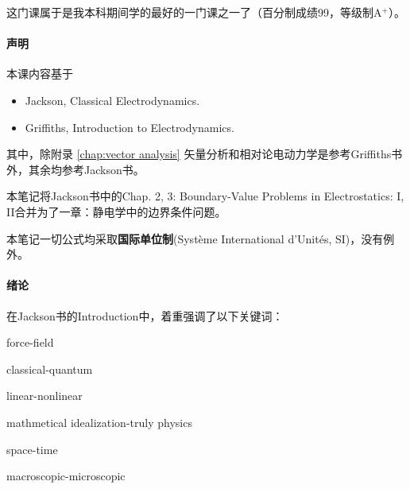 \preface

这门课属于是我本科期间学的最好的一门课之一了（百分制成绩99，等级制A$^+$）。

\paragraph{声明}

本课内容基于
\begin{itemize}
	\item Jackson, Classical Electrodynamics.
	\item Griffiths, Introduction to Electrodynamics.
\end{itemize}
其中，除附录 \ref{chap:vector analysis} 矢量分析和相对论电动力学是参考Griffiths书外，其余均参考Jackson书。

本笔记将Jackson书中的Chap. 2, 3: Boundary-Value Problems in Electrostatics: I, II合并为了一章：静电学中的边界条件问题。

本笔记一切公式均采取\textbf{国际单位制}(Système International d'Unités, SI)，没有例外。

\paragraph{绪论}
在Jackson书的Introduction中，着重强调了以下关键词：
\begin{compactitem}
	\item force-field
	\item classical-quantum
	\item linear-nonlinear
	\item mathmetical idealization-truly physics
	\item space-time
	\item macroscopic-microscopic
\end{compactitem}